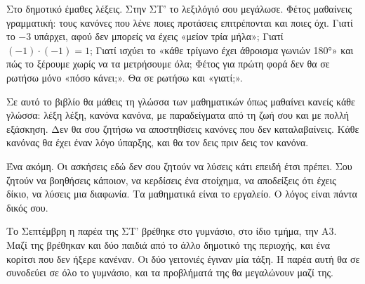 Στο δημοτικό έμαθες λέξεις. Στην ΣΤ’ το λεξιλόγιό σου μεγάλωσε. Φέτος μαθαίνεις γραμματική: τους κανόνες που λένε ποιες προτάσεις επιτρέπονται και ποιες όχι. Γιατί το $-3$ υπάρχει, αφού δεν μπορείς να έχεις «μείον τρία μήλα»; Γιατί $(-1)\cdot(-1)=1$; Γιατί ισχύει το «κάθε τρίγωνο έχει άθροισμα γωνιών 180°» και πώς το ξέρουμε χωρίς να τα μετρήσουμε όλα; Φέτος για πρώτη φορά δεν θα σε ρωτήσω μόνο «πόσο κάνει;». Θα σε ρωτήσω και «γιατί;».

Σε αυτό το βιβλίο θα μάθεις τη γλώσσα των μαθηματικών όπως μαθαίνει κανείς κάθε γλώσσα: λέξη λέξη, κανόνα κανόνα, με παραδείγματα από τη ζωή σου και με πολλή εξάσκηση. Δεν θα σου ζητήσω να αποστηθίσεις κανόνες που δεν καταλαβαίνεις. Κάθε κανόνας θα έχει έναν λόγο ύπαρξης, και θα τον δεις πριν δεις τον κανόνα.

Ένα ακόμη. Οι ασκήσεις εδώ δεν σου ζητούν να λύσεις κάτι επειδή έτσι πρέπει. Σου ζητούν να βοηθήσεις κάποιον, να κερδίσεις ένα στοίχημα, να αποδείξεις ότι έχεις δίκιο, να λύσεις μια διαφωνία. Τα μαθηματικά είναι το εργαλείο. Ο λόγος είναι πάντα δικός σου.


Το Σεπτέμβρη η παρέα της ΣΤ’ βρέθηκε στο γυμνάσιο, στο ίδιο τμήμα, την Α3. Μαζί της βρέθηκαν και δύο παιδιά από το άλλο δημοτικό της περιοχής, και ένα κορίτσι που δεν ήξερε κανέναν. Οι δύο γειτονιές έγιναν μία τάξη. Η παρέα αυτή θα σε συνοδεύει σε όλο το γυμνάσιο, και τα προβλήματά της θα μεγαλώνουν μαζί της.

